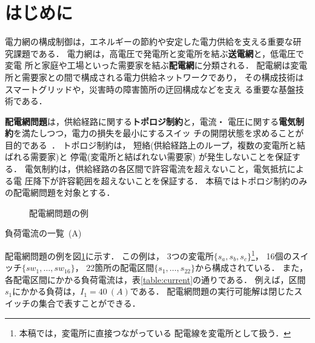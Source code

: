 \section{はじめに}\label{chap:intro}

電力網の構成制御は，エネルギーの節約や安定した電力供給を支える重要な研
究課題である．
電力網は，高電圧で発電所と変電所を結ぶ\textbf{送電網}と，低電圧で変電
所と家庭や工場といった需要家を結ぶ\textbf{配電網}に分類される．
配電網は変電所と需要家との間で構成される電力供給ネットワークであり，
その構成技術はスマートグリッドや，災害時の障害箇所の迂回構成などを支え
る重要な基盤技術である．

\textbf{配電網問題}は，供給経路に関する\textbf{トポロジ制約}と，電流・
電圧に関する\textbf{電気制約}を満たしつつ，電力の損失を最小にするスイッ
チの開閉状態を求めることが目的である~\cite{Hayashi:dnet:model}．
トポロジ制約は，
短絡(供給経路上のループ，複数の変電所と結ばれる需要家)と
停電(変電所と結ばれない需要家)
が発生しないことを保証する．
電気制約は，供給経路の各区間で許容電流を超えないこと，電気抵抗による電
圧降下が許容範囲を超えないことを保証する．
本稿ではトポロジ制約のみの配電網問題を対象とする．



\begin{figure}[tbp]
 \centering
 \scalebox{0.6}{}
  \caption{配電網問題の例}
  \label{fig:test-input}
\end{figure}

\begin{table}[tbp]
 \centering
 \caption{負荷電流の一覧~(A)}
 \label{table:current}
 
\end{table}




配電網問題の例を図\ref{fig:test-input}に示す．
この例は，
3つの変電所$\{s_{a}, s_{b}, s_{c}\}$\footnote{本稿では，変電所に直接つながっている
配電線を変電所として扱う．}，%
16個のスイッチ$\{sw_{1},\ldots, sw_{16}\}$，
22箇所の配電区間$\{s_{1},\ldots, s_{22}\}$から構成されている．
また，各配電区間にかかる負荷電流は，表\ref{table:current}の通りである．
例えば，区間$s_1$にかかる負荷は，$I_1=40~(A)$である．
配電網問題の実行可能解は閉じたスイッチの集合で表すことができる．


